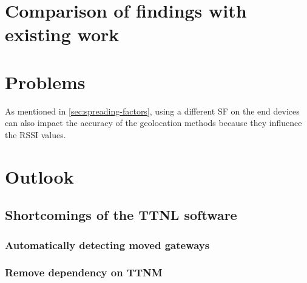 

\section{Comparison of findings with existing work}


\section{Problems}


As mentioned in \cref{sec:spreading-factors}, using a different \ac{SF} on the end devices can also impact the accuracy of the geolocation methods because they influence the \ac{RSSI} values.

\section{Outlook}


\subsection{Shortcomings of the \acf{TTNL} software}


\subsubsection{Automatically detecting moved gateways}


\subsubsection{Remove dependency on \acl{TTNM}}

